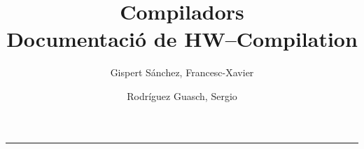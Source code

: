 \documentclass[a4paper,12pt,catalan]{article}
\begin{document}
\title{Compiladors\\ Documentació de HW--Compilation}  

\author{Gispert Sánchez, Francesc-Xavier \and Rodríguez Guasch, Sergio}

\maketitle

\noindent \rule[0.5ex]{1\columnwidth}{1pt}

\tableofcontents

\clearpage




\clearpage



\clearpage



\clearpage



\clearpage



\clearpage



\clearpage



\clearpage



\clearpage


\nocite{*}
\printbibliography[heading=bibintoc]
\end{document}
